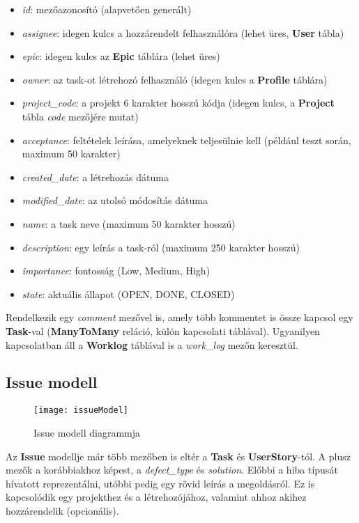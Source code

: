 \begin{itemize}
	\item \textit{id}: mezőazonosító (alapvetően generált)
	\item \textit{assignee}: idegen kulcs a hozzárendelt felhasználóra (lehet üres, \textbf{User} tábla)
	\item \textit{epic}: idegen kulcs az \textbf{Epic} táblára (lehet üres)
	\item \textit{owner}: az task-ot létrehozó felhasználó (idegen kulcs a \textbf{Profile} táblára)
	\item \textit{project\_code}: a projekt 6 karakter hosszú kódja (idegen kulcs, a \textbf{Project} tábla \textit{code} mezőjére mutat)
	\item \textit{acceptance}: feltételek leírása, amelyeknek teljesülnie kell (például teszt során, maximum 50 karakter)
	\item \textit{created\_date}: a létrehozás dátuma
	\item \textit{modified\_date}: az utolsó módosítás dátuma
	\item \textit{name}: a task neve (maximum 50 karakter hosszú)
	\item \textit{description}: egy leírás a task-ról (maximum 250 karakter hosszú)
	\item \textit{importance}: fontosság (Low, Medium, High)
	\item \textit{state}: aktuális állapot (OPEN, DONE, CLOSED)
\end{itemize}

Rendelkezik egy \textit{comment} mezővel is, amely több kommentet is össze kapcsol egy \textbf{Task}-val (\textbf{ManyToMany} reláció, külön kapcsolati táblával). Ugyanilyen kapcsolatban áll a \textbf{Worklog} táblával is a \textit{work\_log} mezőn keresztül.

\subsection{Issue modell}

\begin{figure}[H]
	\centering
	\texttt{[image: issueModel]}
	\caption{Issue modell diagrammja}
	\label{fig:issuemodel}
\end{figure}

Az \textbf{Issue} modellje már több mezőben is eltér a \textbf{Task} és \textbf{UserStory}-tól. A plusz mezők a korábbiakhoz képest, a \textit{defect\_type} és \textit{solution}. Előbbi a hiba típusát hívatott reprezentálni, utóbbi pedig egy rövid leírás a megoldásról. Ez is kapcsolódik egy projekthez és a létrehozójához, valamint ahhoz akihez hozzárendelik (opcionális).

